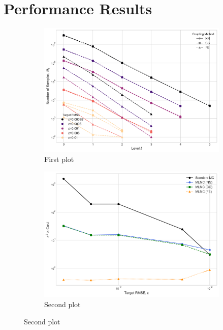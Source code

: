\chapter{Performance Results}\label{chap:performance}


\begin{figure}[htbp]
    \centering
    \begin{subfigure}{0.45\textwidth}
        \centering
        \includegraphics[width=\linewidth]{graphics/she_sq_amps_nums.png}
        \caption{First plot}
        \label{fig:plot1}
    \end{subfigure}
    \hfill
    \begin{subfigure}{0.45\textwidth}
        \centering
        \includegraphics[width=\linewidth]{graphics/she_sq_amp_costs.png}
        \caption{Second plot}
        \label{fig:plot2}
    \end{subfigure}
    

\end{figure}
